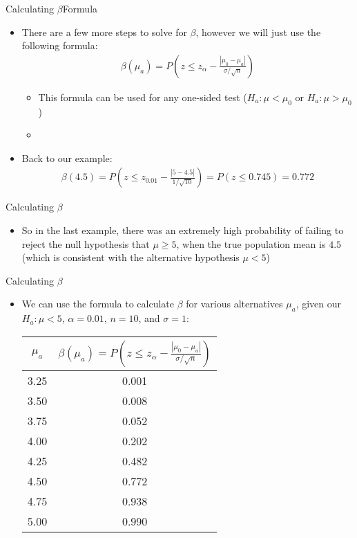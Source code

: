 \documentclass[xcolor=dvipsnames]{beamer}
\begin{document}
\begin{frame}{Calculating $\beta$}{Formula}
	\begin{itemize}
		\item There are a few more steps to solve for $\beta$, however we will just use the following formula:
		\begin{gather*}
			\beta(\mu_a) = P\left(z \leq z_{\alpha} - \frac{|\mu_0 - \mu_a|}{\sigma / \sqrt{n}} \right)
		\end{gather*}
		\begin{itemize}
			\item This formula can be used for any one-sided test ($H_a: \mu < \mu_0$ or $H_a: \mu > \mu_0$)
			\item[]
		\end{itemize}
	\item Back to our example:
	\begin{align*}
	\beta(4.5) = P\left(z \leq z_{0.01} - \frac{|5 - 4.5|}{1 / \sqrt{10}} \right) = P(z \leq 0.745) = 0.772
	\end{align*}
	\end{itemize}
\end{frame}

\begin{frame}{Calculating $\beta$}
	\begin{itemize}
		\item So in the last example, there was an extremely high probability of failing to reject the null hypothesis that $\mu \geq 5$, when the true population mean is $4.5$ (which is consistent with the alternative hypothesis $\mu < 5$)
	\end{itemize}
\end{frame}

\begin{frame}{Calculating $\beta$}
	\begin{itemize}
		\item We can use the formula to calculate $\beta$ for various alternatives $\mu_a$, given our $H_a: \mu < 5$, $\alpha = 0.01$, $n = 10$, and $\sigma = 1$: 
		\vspace{5mm}
		\begin{center}
			\begin{tabular}{|c|c|}
				\hline 
				$\mu_a$ & $\beta(\mu_a)= P\left(z \leq z_{\alpha} - \frac{|\mu_0 - \mu_a|}{\sigma / \sqrt{n}} \right)$ \\ \hline \hline
				3.25 & 0.001 \\ \hline 
				3.50& 0.008 \\ \hline 
				3.75& 0.052 \\ \hline 
				4.00& 0.202 \\ \hline 
				4.25& 0.482\\ \hline 
				4.50& 0.772 \\ \hline 
				4.75& 0.938\\ \hline 
				5.00& 0.990\\ \hline 
			\end{tabular}
		\end{center}
	\end{itemize}
\end{frame}
\end{document}
